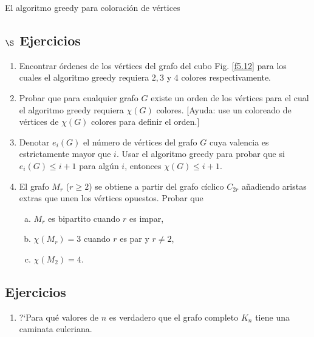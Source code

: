 \begin{section}{El algoritmo greedy para coloración de vértices}

\subsection*{\Large $\S$ Ejercicios}\label{ejercicio5.7} 
	
\begin{enumerate}[1)]
\item Encontrar órdenes de los vértices del grafo del cubo Fig. \ref{f5.12} 
para los cuales el algoritmo greedy requiera $2, 3$ y $4$
colores respectivamente.
\item \label{ejercicio5.7.2} Probar que para cualquier grafo $G$ existe un orden de los
vértices para el cual el algoritmo greedy requiera $\chi(G)$
colores. [Ayuda: use un coloreado de vértices de $\chi(G)$ colores
para definir el orden.]
\item Denotar $e_i(G)$ el número de vértices del grafo $G$ cuya valencia es
estrictamente mayor que $i$. Usar el algoritmo greedy para probar
que si $e_i(G) \le i+1$ para algún $i$, entonces $\chi(G) \le
i+1$.
\item El grafo $M_r$ ($r\ge 2$) se obtiene a partir del grafo cíclico $C_{2r}$ añadiendo
aristas extras que unen los vértices opuestos. Probar que
\begin{enumerate}[a)]
	\item $M_r$ es bipartito cuando $r$ es impar,
	
	\item $\chi(M_r)=3$ cuando $r$ es par y $r\not= 2$,
	
	\item $\chi(M_2)=4$.
\end{enumerate}
\end{enumerate}


\section{Ejercicios}
\begin{enumerate}[1)]
\item ?`Para qué valores de $n$ es verdadero que el grafo completo $K_n$
tiene una caminata euleriana.


\end{enumerate}
\end{section}
